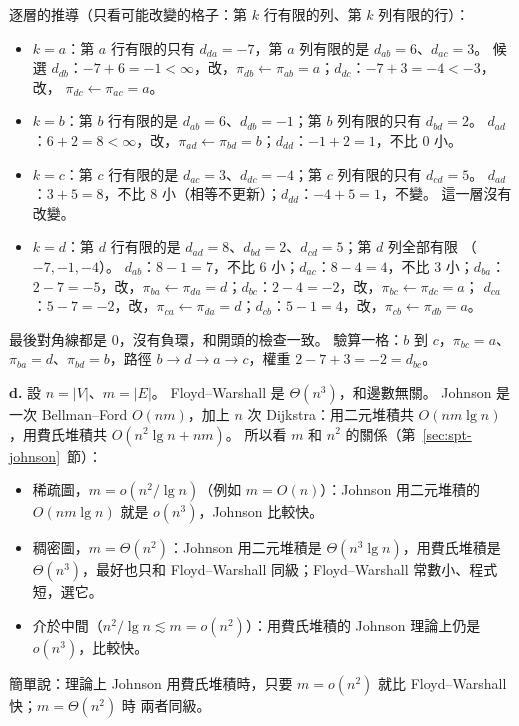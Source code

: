 逐層的推導（只看可能改變的格子：第 $k$ 行有限的列、第 $k$ 列有限的行）：
\begin{itemize}
\item $k = a$：第 $a$ 行有限的只有 $d_{da} = -7$，第 $a$ 列有限的是 $d_{ab} = 6$、$d_{ac} = 3$。 候選
$d_{db}$：$-7 + 6 = -1 < \infty$，改，$\pi_{db} \gets \pi_{ab} = a$；$d_{dc}$：$-7 + 3 = -4 < -3$，改，
$\pi_{dc} \gets \pi_{ac} = a$。
\item $k = b$：第 $b$ 行有限的是 $d_{ab} = 6$、$d_{db} = -1$；第 $b$ 列有限的只有 $d_{bd} = 2$。
$d_{ad}$：$6 + 2 = 8 < \infty$，改，$\pi_{ad} \gets \pi_{bd} = b$；$d_{dd}$：$-1 + 2 = 1$，不比 $0$ 小。
\item $k = c$：第 $c$ 行有限的是 $d_{ac} = 3$、$d_{dc} = -4$；第 $c$ 列有限的只有 $d_{cd} = 5$。
$d_{ad}$：$3 + 5 = 8$，不比 $8$ 小（相等不更新）；$d_{dd}$：$-4 + 5 = 1$，不變。 這一層沒有改變。
\item $k = d$：第 $d$ 行有限的是 $d_{ad} = 8$、$d_{bd} = 2$、$d_{cd} = 5$；第 $d$ 列全部有限
（$-7, -1, -4$）。 $d_{ab}$：$8 - 1 = 7$，不比 $6$ 小；$d_{ac}$：$8 - 4 = 4$，不比 $3$ 小；$d_{ba}$：
$2 - 7 = -5$，改，$\pi_{ba} \gets \pi_{da} = d$；$d_{bc}$：$2 - 4 = -2$，改，$\pi_{bc} \gets \pi_{dc} = a$；
$d_{ca}$：$5 - 7 = -2$，改，$\pi_{ca} \gets \pi_{da} = d$；$d_{cb}$：$5 - 1 = 4$，改，$\pi_{cb} \gets
\pi_{db} = a$。
\end{itemize}
最後對角線都是 $0$，沒有負環，和開頭的檢查一致。 驗算一格：$b$ 到 $c$，$\pi_{bc} = a$、
$\pi_{ba} = d$、$\pi_{bd} = b$，路徑 $b \to d \to a \to c$，權重 $2 - 7 + 3 = -2 = d_{bc}$。

\textbf{d.} 設 $n = |V|$、$m = |E|$。 Floyd--Warshall 是 $\Theta(n^3)$，和邊數無關。 Johnson 是一次
Bellman--Ford $O(nm)$，加上 $n$ 次 Dijkstra：用二元堆積共 $O(nm \lg n)$，用費氏堆積共
$O(n^2 \lg n + nm)$。 所以看 $m$ 和 $n^2$ 的關係（第~\ref{sec:spt-johnson}~節）：
\begin{itemize}
\item 稀疏圖，$m = o(n^2 / \lg n)$（例如 $m = O(n)$）：Johnson 用二元堆積的 $O(nm \lg n)$ 就是
$o(n^3)$，Johnson 比較快。
\item 稠密圖，$m = \Theta(n^2)$：Johnson 用二元堆積是 $\Theta(n^3 \lg n)$，用費氏堆積是
$\Theta(n^3)$，最好也只和 Floyd--Warshall 同級；Floyd--Warshall 常數小、程式短，選它。
\item 介於中間（$n^2 / \lg n \lesssim m = o(n^2)$）：用費氏堆積的 Johnson 理論上仍是 $o(n^3)$，比較快。
\end{itemize}
簡單說：理論上 Johnson 用費氏堆積時，只要 $m = o(n^2)$ 就比 Floyd--Warshall 快；$m = \Theta(n^2)$ 時
兩者同級。

